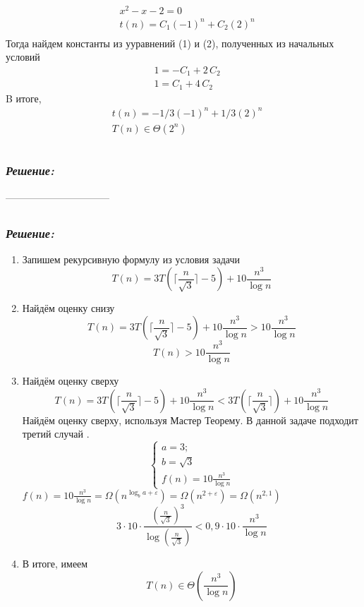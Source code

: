 \documentclass[a4paper, 11pt]{article} %
\newcommand*\circled[1]{\tikz[baseline=(char.base)]{
            \node[shape=circle,draw,inner sep=2pt] (char) {#1};}}
\begin{document}
\begin{enumerate}
\begin{align*}
&x^2-x-2 = 0\\
&t(n) = C_1 (-1)^n + C_2 (2)^n\\
\end{align*}
Тогда найдем константы из ууравнений (1) и (2), полученных из начальных условий 
\begin{align}
&1 = -C_1 + 2\,C_2\\
&1 = C_1 + 4\,C_2
\end{align}
B итоге,
\begin{align*}
&t(n) = -1/3(-1)^n + 1/3(2)^n\\
&T(n) \in \Theta(2^n)\\
\end{align*}
\end{enumerate}

\subsection*{\circled{2}} 	
\subsubsection*{\textit{Решение:}}
--------------------------------

\subsection*{\circled{3}} 	
\subsubsection*{\textit{Решение:}}
\begin{enumerate}
	\item Запишем рекурсивную формулу из условия задачи
	\[T(n) = 3 T(\lceil \frac{n}{\sqrt{3}}\rceil - 5) + 10 \frac{n^3}{\log n}\]
	\item Найдём оценку снизу
	\[T(n) = 3 T(\lceil \frac{n}{\sqrt{3}}\rceil - 5) + 10 \frac{n^3}{\log n} > 10 \frac{n^3}{\log n}\]
	\[T(n) > 10 \frac{n^3}{\log n}\]
	\item Найдём оценку сверху
	\[T(n) = 3 T(\lceil \frac{n}{\sqrt{3}}\rceil - 5) + 10 \frac{n^3}{\log n} < 3 T(\lceil \frac{n}{\sqrt{3}}\rceil) + 10 \frac{n^3}{\log n}\]
	Найдём оценку сверху, используя Мастер Теорему. В данной задаче подходит третий случай .
	\[\begin{cases}
		a = 3; \\
		b = \sqrt{3}\\
		f(n) = 10 \frac{n^3}{\log n}
	\end{cases}
	\]
	$f(n) = 10 \frac{n^3}{\log n} = \Omega (n^{\log_b a + \varepsilon}) = \Omega (n^{2 + \varepsilon}) = \Omega (n^{2,1})$
	\[3\cdot 10 \cdot \frac{(\frac{n}{\sqrt{3}})^3}{\log (\frac{n}{\sqrt{3}})} < 0,9 \cdot 10 \cdot\frac{n^3}{\log n}\]
	\item В итоге, имеем 
	\[T(n) \in \Theta (\frac{n^3}{\log n}) \]
\end{enumerate}
\end{document}
